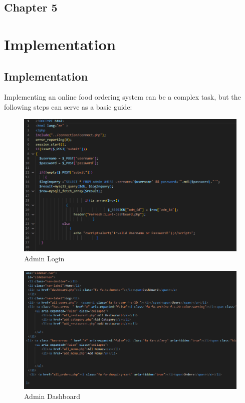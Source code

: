 \begin{center}
    \section*{\fontsize{20}{20}\selectfont Chapter 5}
\end{center}
\vspace{10mm}


\section{Implementation}

\subsection{Implementation}

Implementing an online food ordering system can be a complex task, but the following steps can serve as a basic guide:
\begin{figure}[h]
    \centering
    \includegraphics[scale=0.55]{c1.png}
    \caption{Admin Login}
    \label{fig:pereva}
\end{figure}

\begin{figure}[h]
    \centering
    \includegraphics[scale=0.55]{c2.png}
    \caption{Admin Dashboard}
    \label{fig:pereva}
\end{figure}

